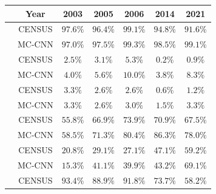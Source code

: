 \begin{table}[ht!]
\centering
\renewcommand{\arraystretch}{1.5}
\begin{tabular}{|c|c||c|c|c|c|c|}
\cline{2-7}
\rowcolor{lightgray}
\multicolumn{1}{c|}{\cellcolor{white}}& Year & 2003 & 2005 & 2006 & 2014 & 2021 \\ \hline

\rowcolor{color_census}
\cellcolor{white} & CENSUS & $97.6\%$ & $96.4\%$ & $99.1\%$ & $94.8\%$ & $91.6\%$\\\cline{2-7}

\rowcolor{color_mccnn}
\multirow{-2}{*}{\cellcolor{white} $acc$ $\uparrow$} & MC-CNN & $97.0\%$ & $97.5\%$ & $99.3\%$ & $98.5\%$ & $99.1\%$\\

\rowcolor{color_census}\hline
\cellcolor{white} & CENSUS & $2.5\%$ & $3.1\%$ & $5.3\%$ & $0.2\%$ & $0.9\%$\\\cline{3-7} 

\rowcolor{color_mccnn}
\multirow{-2}{*}{\cellcolor{white} $\varepsilon_{~~~}$ $\downarrow$} & MC-CNN & $4.0\%$ & $5.6\%$ & $10.0\%$ & $3.8\%$ & $8.3\%$\\

\rowcolor{color_census}\hline
\cellcolor{white} & CENSUS & $3.3\%$ & $2.6\%$ & $2.6\%$ & $0.6\%$ & $1.2\%$\\\cline{3-7} 

\rowcolor{color_mccnn}
\multirow{-2}{*}{\cellcolor{white} $s_{rel}$ $\downarrow$} & MC-CNN & $3.3\%$ & $2.6\%$ & $3.0\%$ & $1.5\%$ & $3.3\%$\\

\rowcolor{color_census}\hline
\cellcolor{white} & CENSUS & $55.8\%$ & $66.9\%$ & $73.9\%$ & $70.9\%$ & $67.5\%$\\\cline{3-7} 

\rowcolor{color_mccnn}
\multirow{-2}{*}{\cellcolor{white} $o_{rel}$ $\downarrow$} & MC-CNN & $58.5\%$ & $71.3\%$ & $80.4\%$ & $86.3\%$ & $78.0\%$\\

\rowcolor{color_census}\hline
\cellcolor{white} & CENSUS & $20.8\%$ & $29.1\%$ & $27.1\%$ & $47.1\%$ & $59.2\%$\\\cline{3-7} 

\rowcolor{color_mccnn}
\multirow{-2}{*}{\cellcolor{white} $p_{amb}$} & MC-CNN & $15.3\%$ & $41.1\%$ & $39.9\%$ & $43.2\%$ & $69.1\%$\\\hline

\rowcolor{color_census}\hline
\cellcolor{white} & CENSUS & $93.4\%$ & $88.9\%$ & $91.8\%$ & $73.7\%$ & $58.2\%$\\\cline{3-7} 


\end{tabular}
\end{table}
